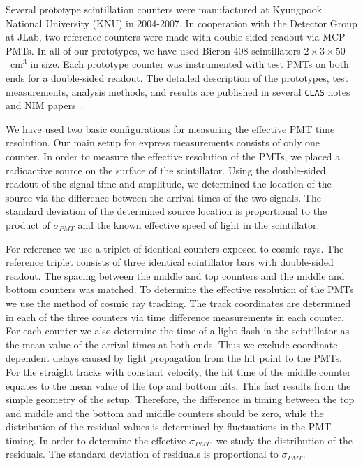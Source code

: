 Several prototype scintillation counters were manufactured at Kyungpook 
National University (KNU) in 2004-2007.  In cooperation with the Detector 
Group at JLab, two reference counters were made with double-sided readout 
via MCP PMTs.  In all of our prototypes, we have used Bicron-408 
scintillators $2 \times 3 \times 50$~cm$^3$ in size.  Each prototype counter 
was instrumented with test PMTs on both ends for a double-sided readout.
The detailed description of the prototypes, test measurements, analysis 
methods, and results are published in several {\tt CLAS} notes and NIM 
papers~\cite{Baturin:2005,r1,llg,barb06}.

We have used two basic configurations for measuring the effective PMT time 
resolution.  Our main setup for express measurements consists of only one 
counter.  In order to measure the effective resolution of the PMTs, we placed 
a radioactive source on the surface of the scintillator.  Using the 
double-sided readout of the signal time and amplitude, we determined the 
location of the source via the difference between the arrival times of the
two signals.  The standard deviation of the determined source location is 
proportional to the product of $\sigma_{PMT}$ and the known effective speed 
of light in the scintillator.

For reference we use a triplet of identical counters exposed to cosmic rays.
The reference triplet consists of three identical scintillator bars with 
double-sided readout.  The spacing between the middle and top counters and the
middle and bottom counters was matched.  To determine the effective 
resolution of the PMTs we use the method of cosmic ray tracking.  The track 
coordinates are determined in each of the three counters via time difference 
measurements in each counter.  For each counter we also determine the time 
of a light flash in the scintillator as the mean value of the arrival times 
at both ends.  Thus we exclude coordinate-dependent delays caused by light 
propagation from the hit point to the PMTs.  For the straight tracks with 
constant velocity, the hit time of the middle counter equates to the mean 
value of the top and bottom hits.  This fact results from the simple geometry 
of the setup.  Therefore, the difference in timing between the top and
middle and the bottom and middle counters should be zero, while the 
distribution of the residual values is determined by fluctuations in the PMT 
timing.  In order to determine the effective $\sigma_{PMT}$, we study the 
distribution of the residuals.  The standard deviation of residuals is 
proportional to $\sigma_{PMT}$.

